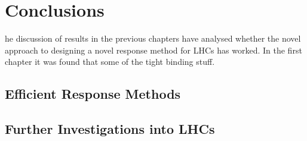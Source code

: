 %
%
\let\textcircled=\pgftextcircled
\chapter{Conclusions}
\label{chap:discussion}

he discussion of results in the previous chapters have analysed whether
the novel approach to designing a novel response method for LHCs has worked. In 
the first chapter it was found that some of the tight binding stuff.

\section{Efficient Response Methods}
\label{sec:future_response_methods}


\section{Further Investigations into LHCs}
\label{sec:lhc_investigations}





